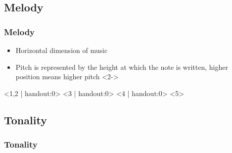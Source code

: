 \documentclass[english]{beamer}
\begin{document}
\subsection{Melody}
	\begin{frame}
		\frametitle{Melody}
		\begin{itemize}
			\item \alert{Horizontal} dimension of music
			\item \alert{Pitch} is represented by the \alert{height} at which the note is written, higher position means higher pitch
			<2->
		\end{itemize}
		\begin{center}
			<1,2 | handout:0>
			<3 | handout:0>
			<4 | handout:0>
			<5>
			\vfill
			\href{file:///home/trigork/presentation/midi/intro_scale.mp3}{}
		\end{center}
	\end{frame}
\subsection{Tonality}
\begin{frame}
	\frametitle{Tonality}
\end{frame}
\end{document}
